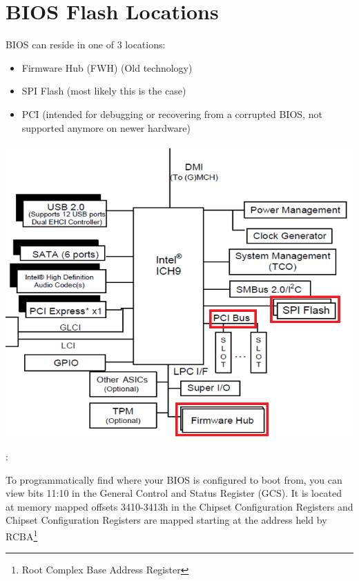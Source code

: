\section{BIOS Flash Locations}
\begin{note}
BIOS can reside in one of 3 locations:
\begin{itemize}
	\item Firmware Hub (FWH) (Old technology)
	\item SPI Flash (most likely this is the case)
	\item PCI (intended for debugging or recovering from a corrupted BIOS, not supported anymore on newer hardware)
\end{itemize}
\begin{center}
\includegraphics[scale=0.8]{Images/UEFI/BiosLocations}
\end{center}
\end{note}
\begin{note}:
	
To programmatically find where your BIOS is configured to boot from, you can view bits 11:10 in the General Control and Status Register (GCS). It is located at memory mapped offsets 3410-3413h in the Chipset Configuration Registers and Chipset Configuration Registers are mapped starting at the address held by RCBA\footnote{Root Complex Base Address Register}
\end{note}

